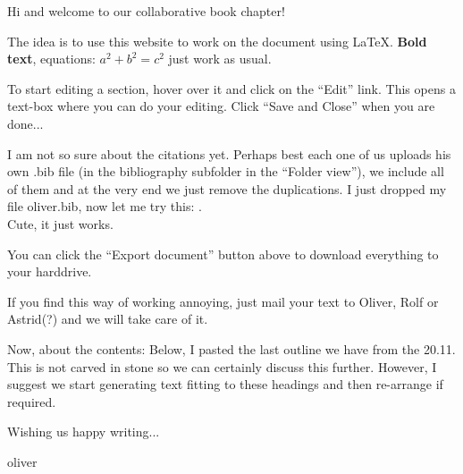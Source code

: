 Hi and welcome to our collaborative book chapter!  

The idea is to use this website to work on the document using \LaTeX.  \textbf{Bold text}, equations: $a^2+b^2=c^2$ just work as usual.  

To start editing a section, hover over it and click on the ``Edit'' link.  This opens a text-box where you can do your editing.  Click ``Save and Close'' when you are done...

I am not so sure about the citations yet.  Perhaps best each one of us uploads his own .bib file (in the bibliography subfolder in the ``Folder view''), we include all of them and at the very end we just remove the duplications.  
I just dropped my file oliver.bib, now let me try this: \cite{buehler2012}.\\
Cute, it just works.  

You can click the ``Export document'' button above to download everything to your harddrive.  

If you find this way of working annoying, just mail your text to Oliver, Rolf or Astrid(?) and we will take care of it.  

Now, about the contents:  
Below, I pasted the last outline we have from the 20.11.  This is not carved in stone so we can certainly discuss this further.  However, I suggest we start generating text fitting to these headings and then re-arrange if required.  

Wishing us happy writing... 

oliver